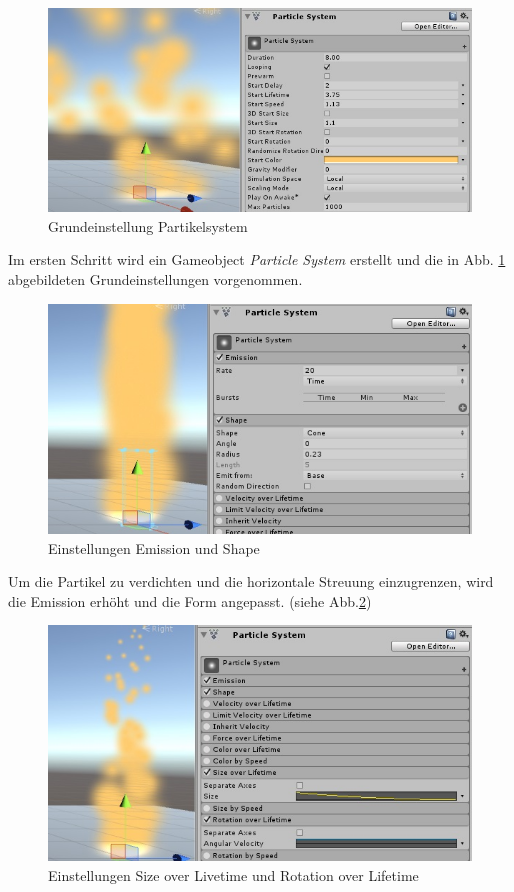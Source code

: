 \begin{figure}[h!]
\centering
\includegraphics[width=0.95\linewidth]{Abbildungen/Unity/Fire/fire1}
\caption{Grundeinstellung Partikelsystem}
\label{fig:fire1}
\end{figure}

Im ersten Schritt wird ein Gameobject \textit{Particle System} erstellt und die in Abb. \ref{fig:fire1} abgebildeten Grundeinstellungen vorgenommen.

\begin{figure}[h!]
\centering
\includegraphics[width=0.95\linewidth]{Abbildungen/Unity/Fire/fire2}
\caption{Einstellungen Emission und Shape}
\label{fig:fire2}
\end{figure}

Um die Partikel zu verdichten und die horizontale Streuung einzugrenzen, wird die Emission erhöht und die Form angepasst. (siehe Abb.\ref{fig:fire2}) 

\begin{figure}[h!]
\centering
\includegraphics[width=0.95\linewidth]{Abbildungen/Unity/Fire/fire3}
\caption{Einstellungen Size over Livetime und Rotation over Lifetime}
\label{fig:fire3}
\end{figure}

